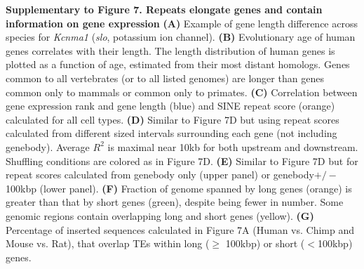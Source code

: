 \textbf{Supplementary to Figure 7. Repeats elongate genes and contain information on gene expression}
\textbf{(A)} Example of gene length difference across species for \textit{Kcnma1} (\textit{slo}, potassium ion channel). 
\textbf{(B)} Evolutionary age of human genes correlates with their length. The length distribution of human genes is plotted as a function of age, estimated from their most distant homologs. Genes common to all vertebrates (or to all listed genomes) are longer than genes common only to mammals or common only to primates.
\textbf{(C)} Correlation between gene expression rank and gene length (blue) and SINE repeat score (orange) calculated for all cell types. 
\textbf{(D)} Similar to Figure 7D but using repeat scores calculated from different sized intervals surrounding each gene (not including genebody). Average $R^2$ is maximal near 10kb for both upstream and downstream. Shuffling conditions are colored as in Figure 7D.
\textbf{(E)} Similar to Figure 7D but for repeat scores calculated from genebody only (upper panel) or genebody$+/-$100kbp (lower panel).
\textbf{(F)} Fraction of genome spanned by long genes (orange) is greater than that by short genes (green), despite being fewer in number. Some genomic regions contain overlapping long and short genes (yellow).
\textbf{(G)} Percentage of inserted sequences calculated in Figure 7A (Human vs. Chimp and Mouse vs. Rat), that overlap TEs within long ($\geq$ 100kbp) or short ($<$100kbp) genes. 